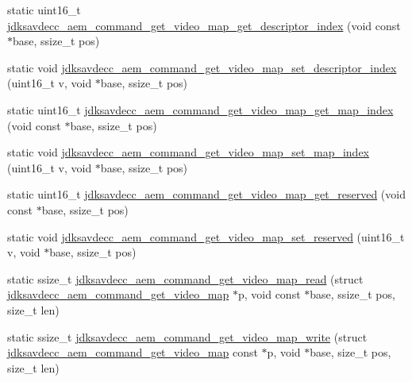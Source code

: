 \begin{DoxyCompactItemize}
\item 
static uint16\+\_\+t \hyperlink{group__command__get__video__map_ga229482bcfd2ac64f3e12ec528b84ee9a}{jdksavdecc\+\_\+aem\+\_\+command\+\_\+get\+\_\+video\+\_\+map\+\_\+get\+\_\+descriptor\+\_\+index} (void const $\ast$base, ssize\+\_\+t pos)
\item 
static void \hyperlink{group__command__get__video__map_ga1d8077b108b910b6b0f76d3ddb8a01ac}{jdksavdecc\+\_\+aem\+\_\+command\+\_\+get\+\_\+video\+\_\+map\+\_\+set\+\_\+descriptor\+\_\+index} (uint16\+\_\+t v, void $\ast$base, ssize\+\_\+t pos)
\item 
static uint16\+\_\+t \hyperlink{group__command__get__video__map_gad547831484161bba4dca2a5fb65a7345}{jdksavdecc\+\_\+aem\+\_\+command\+\_\+get\+\_\+video\+\_\+map\+\_\+get\+\_\+map\+\_\+index} (void const $\ast$base, ssize\+\_\+t pos)
\item 
static void \hyperlink{group__command__get__video__map_ga208a596ded148c93ceecab3426a3b909}{jdksavdecc\+\_\+aem\+\_\+command\+\_\+get\+\_\+video\+\_\+map\+\_\+set\+\_\+map\+\_\+index} (uint16\+\_\+t v, void $\ast$base, ssize\+\_\+t pos)
\item 
static uint16\+\_\+t \hyperlink{group__command__get__video__map_ga7b0e1fa38541060c748f7651409fe870}{jdksavdecc\+\_\+aem\+\_\+command\+\_\+get\+\_\+video\+\_\+map\+\_\+get\+\_\+reserved} (void const $\ast$base, ssize\+\_\+t pos)
\item 
static void \hyperlink{group__command__get__video__map_ga70f6537a14595a2a7c2d9dcf37c8a221}{jdksavdecc\+\_\+aem\+\_\+command\+\_\+get\+\_\+video\+\_\+map\+\_\+set\+\_\+reserved} (uint16\+\_\+t v, void $\ast$base, ssize\+\_\+t pos)
\item 
static ssize\+\_\+t \hyperlink{group__command__get__video__map_gad36f88c5cee009b43346e298f533ddf5}{jdksavdecc\+\_\+aem\+\_\+command\+\_\+get\+\_\+video\+\_\+map\+\_\+read} (struct \hyperlink{structjdksavdecc__aem__command__get__video__map}{jdksavdecc\+\_\+aem\+\_\+command\+\_\+get\+\_\+video\+\_\+map} $\ast$p, void const $\ast$base, ssize\+\_\+t pos, size\+\_\+t len)
\item 
static ssize\+\_\+t \hyperlink{group__command__get__video__map_ga86b76ddd24b2e39c539bf99da9acfceb}{jdksavdecc\+\_\+aem\+\_\+command\+\_\+get\+\_\+video\+\_\+map\+\_\+write} (struct \hyperlink{structjdksavdecc__aem__command__get__video__map}{jdksavdecc\+\_\+aem\+\_\+command\+\_\+get\+\_\+video\+\_\+map} const $\ast$p, void $\ast$base, size\+\_\+t pos, size\+\_\+t len)
\end{DoxyCompactItemize}


